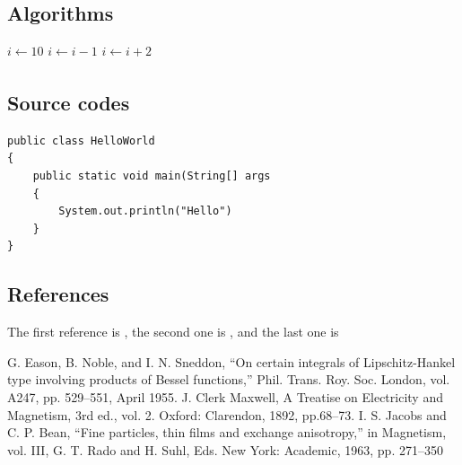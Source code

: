 \documentclass{article}
\begin{document}
\subsection{Algorithms}
\begin{algorithmic}
 \STATE $i \xleftarrow[]{}10$
 \STATE $i \xleftarrow[]{}i-1$
 \ELSE
 \STATE $i \xleftarrow[]{} i + 2$
 \ENDIF
 \ENDIF
 
\end{algorithmic}

\subsection{Source codes}
\begin{verbatim}
public class HelloWorld
{
    public static void main(String[] args 
    {
        System.out.println("Hello")
    }
}
\end{verbatim}

\subsection{References}
The first reference is \cite{Eason}, the second one is \cite{Maxwell}, and the
last one is \cite{Jacobs}

\begin{thebibliography}{}
 G. Eason, B. Noble, and I. N. Sneddon, ``On certain integrals of Lipschitz-Hankel type involving products of Bessel functions,'' Phil. Trans. Roy. Soc. London, vol. A247, pp. 529--551, April 1955.
 J. Clerk Maxwell, A Treatise on Electricity and Magnetism, 3rd ed., vol. 2. Oxford: Clarendon, 1892, pp.68--73.
 I. S. Jacobs and C. P. Bean, ``Fine particles, thin films and exchange anisotropy,'' in Magnetism, vol. III, G. T. Rado and H. Suhl, Eds. New York: Academic, 1963, pp. 271--350
\end{thebibliography}
\end{document}
